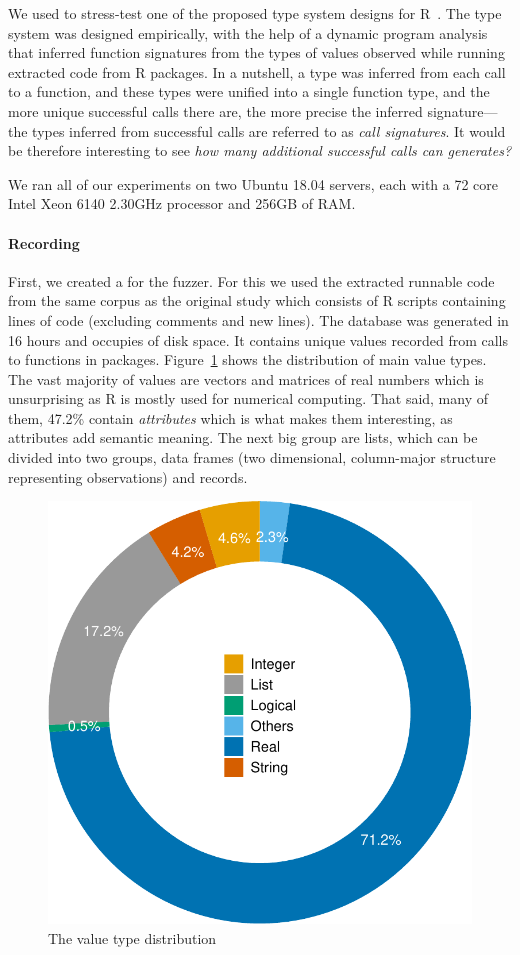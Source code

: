 \documentclass[sigplan,nonacm,anonymous,review]{acmart}
\begin{document}
We used \tool to stress-test one of the proposed type system designs for R~\cite{turcotte2020designing}.
The type system was designed empirically, with the help of a dynamic program analysis that inferred function signatures from the types of values observed while running extracted code from R packages.
In a nutshell, a type was inferred from each call to a function, and these types were unified into a single function type, and the more unique successful calls there are, the more precise the inferred signature---the types inferred from successful calls are referred to as \textit{call signatures}.
It would be therefore interesting to see \emph{how many additional successful calls can \tool generates?}

We ran all of our experiments on two Ubuntu 18.04 servers, each with a 72 core Intel Xeon 6140 2.30GHz processor and 256GB of RAM.

\paragraph{Recording}

First, we created a \sxpdb for the fuzzer.
For this we used the extracted runnable code from the same corpus as the original study which consists of \DBNumSourceFiles R scripts containing \DBSourceLinesOfCodeRnd lines of code (excluding comments and new lines).
The database was generated in 16 hours and occupies \DBFileSize of disk space.
It contains \DBValuesRnd unique values recorded from \DBNumCallsRnd calls to \DBNumFunctionsRnd functions in \DBNumPackages packages.
Figure~\ref{fig:argsdb-value-distribution} shows the distribution of main value types.
The vast majority of values are vectors and matrices of real numbers which is unsurprising as R is mostly used for numerical computing.
That said, many of them, 47.2\%  contain \textit{attributes} which is what makes them interesting, as attributes add semantic meaning.
The next big group are lists, which can be divided into two groups, data frames (two dimensional, column-major structure representing observations) and records.

\begin{figure}
    \centering
    \includegraphics[width=.6\columnwidth]{code-and-figures/argsdb-value-distribution.pdf}
    \vspace{-3mm}
    \caption{The \sxpdb value type distribution}
    \label{fig:argsdb-value-distribution}
\end{figure}
\end{document}

